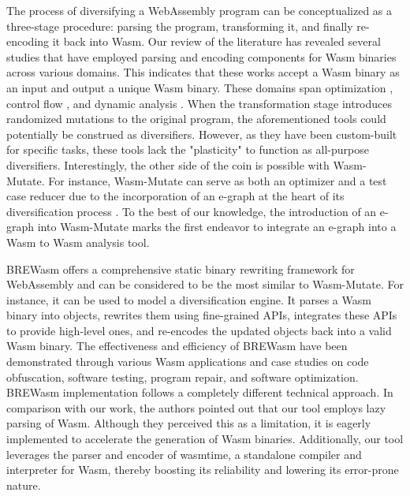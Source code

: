 \documentclass[sigplan,screen]{acmart}
\newcommand*\badge[1]{ \colorbox{red}{\color{white}#1}}
\newcommand{\tool}{{\sc Wasm-Mutate}\xspace}
\newcommand{\wasm}{Wasm\xspace}
\newcommand{\Wasm}{WebAssembly\xspace}
\newcommand{\todo}[1]{%
\refstepcounter{todo}
\noindent\textbf{\badge{TODO}} {\color{red}#1}
\addcontentsline{td}{todo}
{\color{red}\thesection.\thetodo\xspace #1}}
\begin{document}
The process of diversifying a \Wasm program can be conceptualized as a three-stage procedure: parsing the program, transforming it, and finally re-encoding it back into \wasm. 
Our review of the literature has revealed several studies that have employed parsing and encoding components for \wasm binaries across various domains. 
This indicates that these works accept a \wasm binary as an input and output a unique \wasm binary. 
These domains span optimization \cite{wasmslim}, control flow \cite{10123627}, and dynamic analysis \cite{wasabi, stievenart2020compositional, 10123627, BRITO2022102745}.
When the transformation stage introduces randomized mutations to the original program, the aforementioned tools could potentially be construed as diversifiers.
However, as they have been custom-built for specific tasks, these tools lack the "plasticity" to function as all-purpose diversifiers. 
Interestingly, the other side of the coin is possible with \tool.
For instance, \tool can serve as both an optimizer and a test case reducer due to the incorporation of an e-graph at the heart of its diversification process \cite{10.1145/1480881.1480915}. 
To the best of our knowledge, the introduction of an e-graph into \tool marks the first endeavor to integrate an e-graph into a \wasm to \wasm analysis tool.




BREWasm \cite{rewritingtool2023} offers a comprehensive static binary rewriting framework for \Wasm and can be considered to be the most similar to \tool. 
For instance, it can be used to model a diversification engine.
It parses a Wasm binary into objects, rewrites them using fine-grained APIs, integrates these APIs to provide high-level ones, and re-encodes the updated objects back into a valid Wasm binary. 
The effectiveness and efficiency of BREWasm have been demonstrated through various Wasm applications and case studies on code obfuscation, software testing, program repair, and software optimization. 
BREWasm implementation follows a completely different technical approach.
In comparison with our work, the authors pointed out that our tool employs lazy parsing of Wasm. 
Although they perceived this as a limitation, it is eagerly implemented to accelerate the generation of \wasm binaries.
Additionally, our tool leverages the parser and encoder of wasmtime, a standalone compiler and interpreter for Wasm, thereby boosting its reliability and lowering its error-prone nature.
\end{document}
